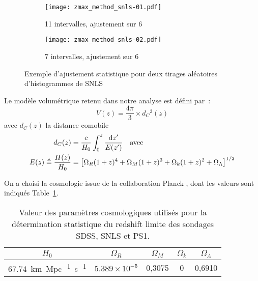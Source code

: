 \documentclass[../main/main.tex]{subfiles}
\begin{document}
\begin{figure}[ht]
    \centering
    \begin{subfigure}[]{.49\linewidth}
        \centering
        \texttt{[image: zmax\_method\_snls-01.pdf]}
        \captionsetup{justification=centering}
        \caption{11 intervalles, ajustement sur 6}
        \label{fig:zmax_method1}
    \end{subfigure}
    \begin{subfigure}[]{.49\linewidth}
        \centering
        \texttt{[image: zmax\_method\_snls-02.pdf]}
        \captionsetup{justification=centering}
        \caption{7 intervalles, ajustement sur 6}
        \label{fig:zmax_method2}
    \end{subfigure}
    \captionsetup{justification=centering}
    \caption{Exemple d'ajustement statistique pour deux tirages aléatoires
    d'histogrammes de SNLS}
    \label{fig:zmax_method}
\end{figure}


Le modèle volumétrique retenu dans notre analyse est défini par~:
\begin{equation}\label{eq:comobvol}
    V(z) = \frac{4\pi}{3}\times d_C{}^3(z)
\end{equation}
avec $d_C(z)$ la distance comobile
\begin{align}
    d_C(z)                           & =
    \frac{c}{H_0} \int_{0}^{z} \frac{\mathrm{d} z'}{E(z')}
    \quad\text{avec}\quad\\
    E(z) \triangleq \frac{H(z)}{H_0} & =
    \left[\Omega_R(1+z)^4 + \Omega_M(1+z)^3 +
        \Omega_k(1+z)^2 + \Omega_\Lambda
    \right]^{1/2}
\end{align}

On a choisi la cosmologie issue de la collaboration Planck \citep{planck2018},
dont les valeurs sont indiqués Table~\ref{tab:planckvals}.

\begin{table}[ht]
    \centering
    \caption{Valeur des paramètres cosmologiques utilisés pour la détermination
    statistique du redshift limite des sondages SDSS, SNLS et PS1.}
    \label{tab:planckvals}
    \begin{tabular}{ccccc}
        \toprule
        $H_0$ &
        $\Omega_R$ & $\Omega_M$ & $\Omega_k$ & $\Omega_\Lambda$ \\
        \midrule
        \SI{67,74}{km.Mpc^{-1}.s^{-1}} &
        $5.389\times10^{-5}$ & 0,3075 & 0 & 0,6910 \\ 
        \bottomrule
    \end{tabular}
\end{table}
\end{document}
